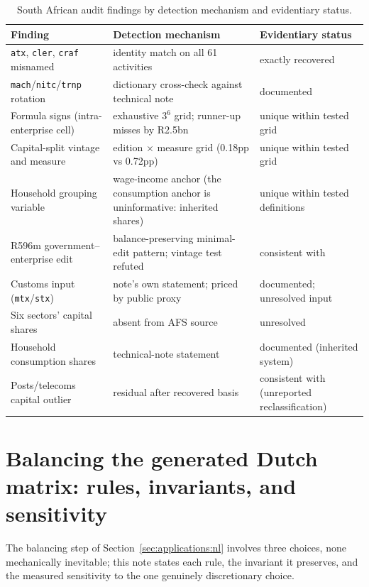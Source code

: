 \begin{landscape}
\begin{table}[p]
\centering\small
\renewcommand{\arraystretch}{1.3}
\begin{tabularx}{\textheight}{%
  >{\raggedright\arraybackslash}p{4.6cm} X
  >{\raggedright\arraybackslash}p{4.8cm}}
\toprule
Finding & Detection mechanism & Evidentiary status \\
\midrule
\texttt{atx}, \texttt{cler}, \texttt{craf} misnamed & identity match on
all 61 activities & exactly recovered \\
\texttt{mach}/\texttt{nitc}/\texttt{trnp} rotation & dictionary
cross-check against technical note & documented \\
Formula signs (intra-enterprise cell) & exhaustive $3^6$ grid; runner-up
misses by R2.5bn & unique within tested grid \\
Capital-split vintage and measure & edition $\times$ measure grid
(0.18pp vs 0.72pp) & unique within tested grid \\
Household grouping variable & wage-income anchor (the consumption
anchor is uninformative: inherited shares) & unique within tested
definitions \\
R596m government--enterprise edit & balance-preserving minimal-edit
pattern; vintage test refuted & consistent with \\
Customs input (\texttt{mtx}/\texttt{stx}) & note's own statement;
priced by public proxy & documented; unresolved input \\
Six sectors' capital shares & absent from AFS source & unresolved \\
Household consumption shares & technical-note statement & documented
(inherited system) \\
Posts/telecoms capital outlier & residual after recovered basis &
consistent with (unreported reclassification) \\
\bottomrule
\end{tabularx}
\caption{South African audit findings by detection mechanism and
evidentiary status.}
\label{tab:evidence}
\end{table}
\end{landscape}

\section{Balancing the generated Dutch matrix: rules, invariants, and
sensitivity}\label{app:nlbalance}

The balancing step of Section~\ref{sec:applications:nl} involves three
choices, none mechanically inevitable; this note states each rule, the
invariant it preserves, and the measured sensitivity to the one genuinely
discretionary choice.

